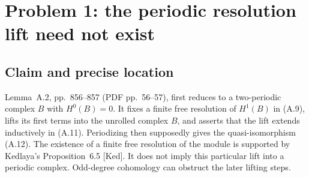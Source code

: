 \documentclass[10pt]{article}
\begin{document}
\section*{Problem 1: the periodic resolution lift need not exist}
\subsection*{Claim and precise location}
Lemma A.2, pp. 856–857 (PDF pp. 56–57), first reduces to a two-periodic complex \(B\) with \(H^0(B)=0\). It fixes a finite free resolution of \(H^1(B)\) in (A.9), lifts its first terms into the unrolled complex \(B\), and asserts that the lift extends inductively in (A.11). Periodizing then supposedly gives the quasi-isomorphism (A.12). The existence of a finite free resolution of the module is supported by Kedlaya’s Proposition 6.5 [Ked]. It does not imply this particular lift into a periodic complex. Odd-degree cohomology can obstruct the later lifting steps.\par
\end{document}
